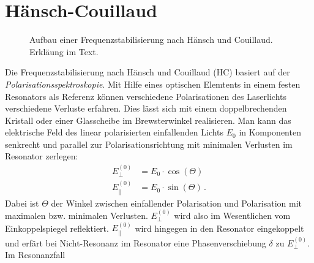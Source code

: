 \section{Hänsch-Couillaud}\label{sec:haensch-couillaud}
\begin{figure}[h]
 	\centering
	\caption[Hänsch-Couillaud - Aufbau]{Aufbau
	einer Frequenzstabilisierung nach Hänsch
	und Couillaud. Erkläung im Text.}\label{fig:haensch-couillaud_aufbau}
\end{figure}
Die Frequenzstabilisierung nach Hänsch und Couillaud (HC)
basiert auf der \textit{Polarisationsspektroskopie}. Mit Hilfe eines
optischen Elemtents in einem festen Resonators als Referenz können verschiedene
Polarisationen des Laserlichts verschiedene Verluste erfahren. Dies lässt sich
mit einem doppelbrechenden Kristall oder einer Glasscheibe im Brewsterwinkel
realisieren. Man kann das elektrische Feld des linear polarisierten einfallenden
Lichts $E_0$ in Komponenten senkrecht und parallel zur Polarisationsrichtung mit
minimalen Verlusten im Resonator zerlegen:
\begin{equation}\label{eq:haensch-couillaud_01}
	\begin{split}
		E_{\perp}^{(0)} & = E_0\cdot\cos{(\Theta)}\\
		E_{\parallel}^{(0)} & = E_0\cdot\sin{(\Theta)}\,.
	\end{split}
\end{equation}
Dabei ist $\Theta$ der Winkel zwischen einfallender Polarisation und
Polarisation mit maximalen bzw. minimalen Verlusten. $E_{\perp}^{(0)}$ wird also
im Wesentlichen vom Einkoppelspiegel reflektiert. $E_{\parallel}^{(0)}$
wird hingegen in den Resonator eingekoppelt und erfärt bei Nicht-Resonanz im
Resonator eine Phasenverschiebung $\delta$ zu $E_{\perp}^{(0)}$. Im Resonanzfall
